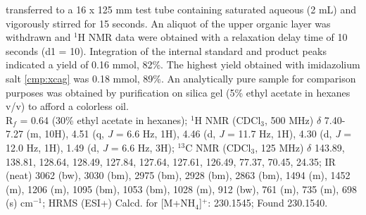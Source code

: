 transferred to a 16 x 125 mm test tube containing saturated aqueous  (2 mL) and vigorously
stirred for 15 seconds. An aliquot of the upper organic layer was withdrawn and $^1$H NMR data were
obtained with a relaxation delay time of 10 seconds (d1 = 10). Integration of the internal standard
and product peaks indicated a yield of 0.16 mmol, 82\%. The highest yield obtained with imidazolium
salt \ref{cmp:xcag} was 0.18 mmol, 89\%. An analytically pure sample for comparison purposes was
obtained by purification on silica gel (5\% ethyl acetate in hexanes v/v) to afford a colorless oil.\\
R$_f$ = 0.64 (30\% ethyl acetate in hexanes); 
$^1$H NMR (CDCl$_3$, 500 MHz) $\delta$ 7.40-7.27 (m, 10H),  4.51 (q, \textit{J} = 6.6 Hz, 1H), 4.46
(d, \textit{J} = 11.7 Hz, 1H), 4.30 (d, \textit{J} = 12.0 Hz, 1H), 1.49 (d, \textit{J} = 6.6 Hz, 
3H); $^{13}$C NMR (CDCl$_3$, 125 MHz) $\delta$ 143.89, 138.81, 128.64, 128.49, 127.84, 127.64,
127.61, 126.49, 77.37, 70.45, 24.35; IR (neat) 3062 (bw), 3030 (bm), 2975 (bm), 2928 (bm), 2863
(bm), 1494 (m), 1452 (m), 1206 (m), 1095 (bm), 1053 (bm), 1028 (m), 912 (bw), 761 (m), 735 (m), 698
(s) cm$^{-1}$; HRMS (ESI+) Calcd.
for  [M+NH$_4$]$^+$:
230.1545; Found 230.1540.

